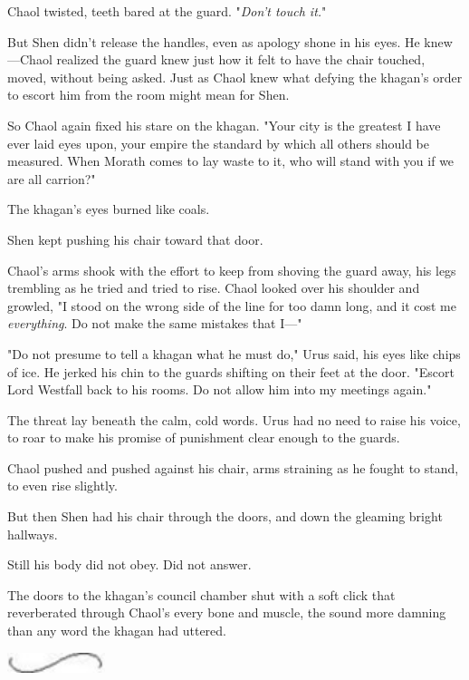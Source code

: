 Chaol twisted, teeth bared at the guard.
"\emph{Don't touch it.}"

But Shen didn't release the handles, even as apology shone in his eyes.
He knew---Chaol realized the guard knew just how it felt to have the chair touched, moved, without being asked.
Just as Chaol knew what defying the khagan's order to escort him from the room might mean for Shen.

So Chaol again fixed his stare on the khagan.
"Your city is the greatest I have ever laid eyes upon, your empire the standard by which all others should be measured.
When Morath comes to lay waste to it, who will stand with you if we are all carrion?"

The khagan's eyes burned like coals.

Shen kept pushing his chair toward that door.

Chaol's arms shook with the effort to keep from shoving the guard away, his legs trembling as he tried and tried to rise.
Chaol looked over his shoulder and growled, "I stood on the wrong side of the line for too damn long, and it cost me \emph{everything}.
Do not make the same mistakes that I---"

"Do not presume to tell a khagan what he must do," Urus said, his eyes like chips of ice.
He jerked his chin to the guards shifting on their feet at the door.
"Escort Lord Westfall back to his rooms.
Do not allow him into my meetings again."

The threat lay beneath the calm, cold words.
Urus had no need to raise his voice, to roar to make his promise of punishment clear enough to the guards.

Chaol pushed and pushed against his chair, arms straining as he fought to stand, to even rise slightly.

But then Shen had his chair through the doors, and down the gleaming bright hallways.

Still his body did not obey.
Did not answer.

The doors to the khagan's council chamber shut with a soft click that reverberated through Chaol's every bone and muscle, the sound more damning than any word the khagan had uttered.

\begin{center}
	\includegraphics[width=1.12in,height=0.24in]{images/seperator}
\end{center}

